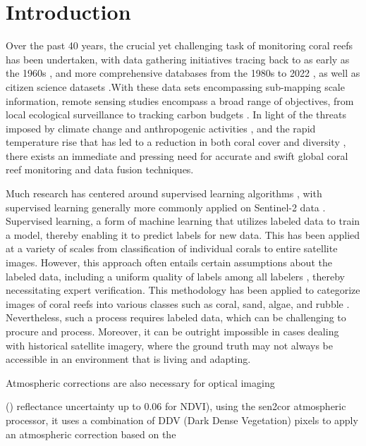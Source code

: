 \documentclass[journal,article,submit,pdftex,moreauthors]{Definitions/mdpi}
\begin{document}

\section{Introduction}

Over the past 40 years, the crucial yet challenging task of monitoring coral reefs has been undertaken, with data gathering initiatives tracing back to as early as the 1960s \cite{goreau1964mass}, and more comprehensive databases from the 1980s to 2022 \cite{Woesik2022},  as well as
citizen science datasets \cite{ALA2021}.With these data sets encompassing sub-mapping scale information, remote sensing studies encompass a broad range of objectives, from local ecological surveillance to tracking carbon budgets \cite{duarte2017reviews}. In light of the threats imposed 
by climate change and anthropogenic activities \cite{hughes2010rising}, 
and the rapid temperature rise that has led to a reduction in both coral cover and diversity \cite{bruno2007thermal} \cite{pandolfi2003global} \cite{hoegh2007coral}, there exists an immediate and pressing need for accurate and swift global coral reef monitoring and data fusion techniques.


Much research has centered around supervised learning algorithms \cite{su14106161} \cite{white2021coral} \cite{pavoni2022taglab} \cite{zeng2022spectral}, with supervised learning generally more commonly applied on Sentinel-2 data \cite{phiri2020sentinel}. 
Supervised learning, a form of machine learning that utilizes labeled data to train a model, thereby enabling it to predict labels for new data.
This has been applied at a variety of scales from classification of individual corals to entire satellite images. However, this approach often entails certain assumptions about the labeled data, including a uniform quality of labels among all labelers \cite{sheng2008get}, 
thereby necessitating expert verification. This methodology has been applied to categorize images of coral reefs into various classes such as coral, sand, algae, and rubble \cite{Li2020}. 
Nevertheless, such a process requires labeled data, which can be challenging to procure and process. Moreover, it can be outright impossible in cases dealing with historical satellite imagery, where the ground truth may not always be accessible in an environment that is living and adapting.

Atmospheric corrections are also necessary for optical imaging 


()\cite{louis2016sentinel} reflectance uncertainty up to 0.06 for NDVI), using the sen2cor atmospheric processor, it uses a combination of DDV (Dark Dense Vegetation) pixels to apply an atmospheric correction based on the \cite{atmospheric_correction1988}
\end{document}
